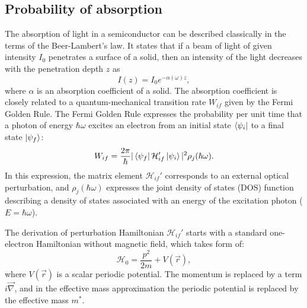 \documentclass[titlepage,a4paper]{book}
\newcommand{\wciecie}{\quad\phantom{v}}
\begin{document}
\subsection{Probability of absorption}
\label{section:oscillator_strength}
\wciecie
The absorption of light in a semiconductor can be described classically in the terms of the Beer-Lambert's law. It states that if a beam of light of given intensity $I_0$ penetrates a surface of a solid, then an intensity of the light decreases with the penetration depth $z$ as
\begin{equation}
\label{eq:L-B_law}
I(z) = I_0 e^{-\alpha (\omega) z},
\end{equation}
where $\alpha$ is an absorption coefficient of a solid. The absorption coefficient is closely related to a quantum-mechanical transition rate $W_{if}$ given by the Fermi Golden Rule. The Fermi Golden Rule expresses the probability per unit time that a photon of energy $\hbar\omega$ excites an electron from an initial state $\bra{\psi_i}$ to a final state $\ket{\psi_f}$:
\begin{equation}
W_{if} = \frac{2\pi}{\hbar} |\bra{\psi_f}\mathcal{H}_{if}'\ket{\psi_i}|^2 \rho_j(\hbar\omega).
\label{eq:FermiGolderRule}
\end{equation}
In this expression, the matrix element $\mathcal{H}_{if}'$ corresponds to an external optical perturbation, and $\rho_j(\hbar\omega)$ expresses the joint density of states (DOS) function describing a density of states associated with an energy of the excitation photon ($E = \hbar \omega$). 

The derivation of perturbation Hamiltonian $\mathcal{H}_{if}'$ starts with a standard one-electron Hamiltonian without magnetic field, which takes form of:
\begin{equation}
\label{eq:Perturbed_Hamiltonian}
\mathcal{H}_0 = \frac{p^2}{2m} + V(\vec{r}),
\end{equation}  
where $V(\vec{r})$ is a scalar periodic potential. The momentum is replaced by a term $i\vec{\nabla}$, and in the effective mass approximation the periodic potential is replaced by the effective mass $m^*$. 
\end{document}
